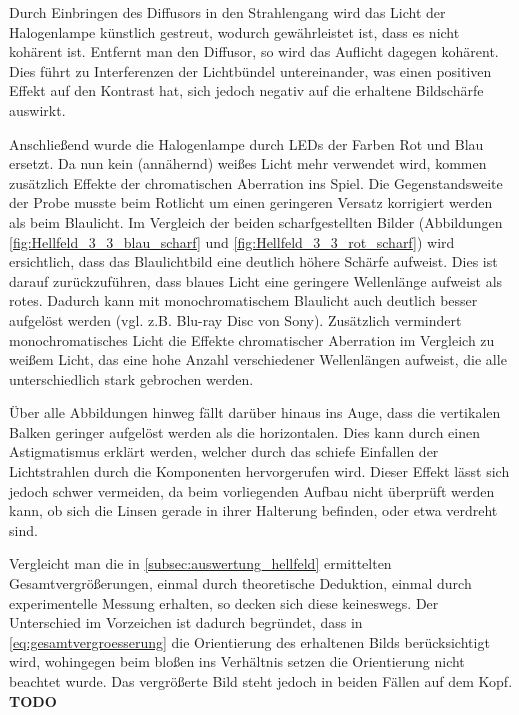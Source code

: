 \documentclass[english, ngerman]{scrartcl}
\begin{document}
Durch Einbringen des Diffusors in den Strahlengang wird das Licht der Halogenlampe künstlich gestreut, wodurch gewährleistet ist, dass es nicht kohärent ist. Entfernt man den Diffusor, so wird das Auflicht dagegen kohärent. Dies führt zu Interferenzen der Lichtbündel untereinander, was einen positiven Effekt auf den Kontrast hat, sich jedoch negativ auf die erhaltene Bildschärfe auswirkt.

Anschließend wurde die Halogenlampe durch LEDs der Farben Rot und Blau ersetzt. Da nun kein (annähernd) weißes Licht mehr verwendet wird, kommen zusätzlich Effekte der chromatischen Aberration ins Spiel. Die Gegenstandsweite der Probe musste beim Rotlicht um einen geringeren Versatz korrigiert werden als beim Blaulicht. Im Vergleich der beiden scharfgestellten Bilder (Abbildungen \ref{fig:Hellfeld_3_3_blau_scharf} und \ref{fig:Hellfeld_3_3_rot_scharf}) wird ersichtlich, dass das Blaulichtbild eine deutlich höhere Schärfe aufweist. Dies ist darauf zurückzuführen, dass blaues Licht eine geringere Wellenlänge aufweist als rotes. Dadurch kann mit monochromatischem Blaulicht auch deutlich besser aufgelöst werden (vgl. z.B. Blu-ray Disc von Sony). Zusätzlich vermindert monochromatisches Licht die Effekte chromatischer Aberration im Vergleich zu weißem Licht, das eine hohe Anzahl verschiedener Wellenlängen aufweist, die alle unterschiedlich stark gebrochen werden.

Über alle Abbildungen hinweg fällt darüber hinaus ins Auge, dass die vertikalen Balken geringer aufgelöst werden als
die horizontalen. Dies kann durch einen Astigmatismus erklärt werden, welcher durch das schiefe Einfallen der Lichtstrahlen durch die Komponenten hervorgerufen wird. Dieser Effekt lässt sich jedoch schwer vermeiden, da beim vorliegenden Aufbau nicht überprüft werden kann, ob sich die Linsen gerade in ihrer Halterung befinden, oder etwa verdreht sind.

Vergleicht man die in \autoref{subsec:auswertung_hellfeld} ermittelten Gesamtvergrößerungen, einmal durch theoretische Deduktion, einmal durch experimentelle Messung erhalten, so decken sich diese keineswegs. Der Unterschied im Vorzeichen ist dadurch begründet, dass in \autoref{eq:gesamtvergroesserung} die Orientierung des erhaltenen Bilds berücksichtigt wird, wohingegen beim bloßen ins Verhältnis setzen die Orientierung nicht beachtet wurde. Das vergrößerte Bild steht jedoch in beiden Fällen auf dem Kopf.
\newline\textbf{TODO}
\end{document}
